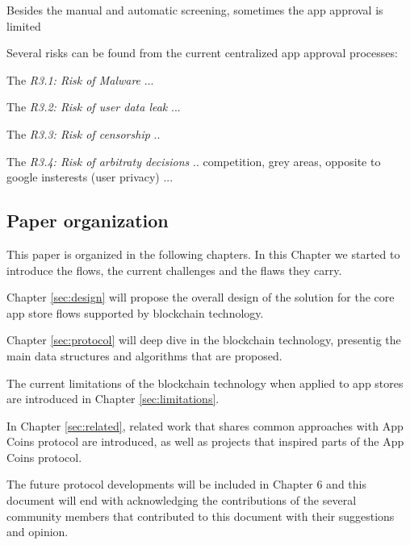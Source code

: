 \medskip

Besides the manual and automatic screening, sometimes the app approval is limited 

Several risks can be found from the current centralized app approval processes:


The {\em R3.1: Risk of Malware} ...

The {\em R3.2: Risk of user data leak} ...

The {\em R3.3: Risk of censorship} ..

The {\em R3.4: Risk of arbitraty decisions} .. competition, grey areas, opposite to google insterests (user privacy) ...



\subsection{Paper organization}

This paper is organized in the following chapters. In this Chapter we started to introduce the flows, the current challenges and the flaws they carry.

Chapter \ref{sec:design} will propose the overall design of the solution for the core app store flows supported by blockchain technology. 

Chapter \ref{sec:protocol} will deep dive in the blockchain technology, presentig the main data structures and algorithms that are proposed.

The current limitations of the blockchain technology when applied to app stores are introduced in Chapter \ref{sec:limitations}.

In Chapter \ref{sec:related}, related work that shares common approaches with App Coins protocol are introduced, as well as projects that inspired parts of the App Coins protocol.


The future protocol developments will be included in Chapter 6 and this document will end with acknowledging the contributions of the several community members that contributed to this document with their suggestions and opinion.


